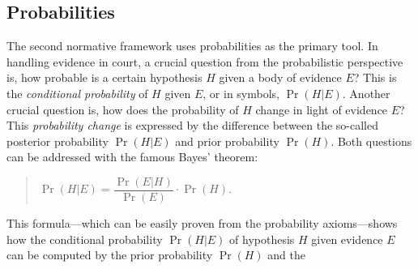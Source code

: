\documentclass[10pt]{article}
\begin{document}
\subsection{Probabilities}
\label{sec:normfram:prob}
The second normative framework %
uses probabilities as the primary tool. 
In handling evidence in court, a crucial question from the probabilistic perspective is, 
how probable is a certain hypothesis $H$ given a body of evidence $E$? This is 
the \textit{conditional probability} of $H$ given $E$, or in symbols, $\Pr(H|E)$. 
Another crucial question is, how does the probability of $H$ 
change in light of evidence $E$? This \textit{probability change} is expressed by 
the difference between the so-called posterior probability $\Pr(H|E)$ and prior 
probability $\Pr(H)$.
Both questions can be addressed with 
the famous Bayes' theorem:
%
\begin{quotation}
	$\Pr(H|E) = \dfrac{\Pr(E|H)}{\Pr(E)}\cdot\Pr(H)$.
\end{quotation}
%
This formula---which can be easily proven from 
the probability axioms---shows how the 
conditional probability $\Pr(H|E)$ of hypothesis $H$ given evidence $E$ 
can be computed by the prior probability $\Pr(H)$ and the 
\end{document}
